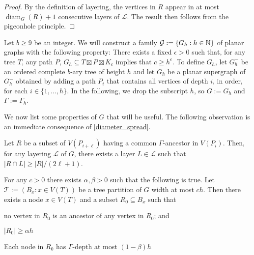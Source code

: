 \documentclass{patmorin}
\newcommand{\defin}[1]{\emph{\color{brightmaroon}#1}}
\DeclareMathOperator{\diam}{diam}
\begin{document}
\begin{proof}
  By the definition of layering, the vertices in $R$ appear in at most $\diam_G(R)+1$ consecutive layers of $\mathcal{L}$. The result then follows from the pigeonhole principle.
\end{proof}


Let $b\ge 9$ be an integer.  We will construct a family $\mathcal{G}:=\{G_h:h\in\mathbb{N}\}$ of planar graphs with the following property:  There exists a fixed $\epsilon >0$ such that, for any tree $T$, any path $P$, $G_h\subseteq T\boxtimes P\boxtimes K_c$ implies that $c\ge h^\epsilon$.  To define $G_h$, let $G_h^-$ be an ordered complete $b$-ary tree of height $h$ and let $G_h$ be a planar supergraph of $G_h^-$ obtained by adding a path $P_i$ that contains all vertices of depth $i$, in order, for each $i\in\{1,\ldots,h\}$.   In the following, we drop the subscript $h$, so $G:=G_h$ and $\Gamma:=\Gamma_h$.

We now list some properties of $G$ that will be useful.  The following observation is an immediate consequence of \cref{diameter_spread}.

\begin{obs}\label{ancestor_spread}
  Let $R$ be a subset of $V(P_{i+\ell})$ having a common $\Gamma$-ancestor in $V(P_i)$.  Then, for any layering $\mathcal{L}$ of $G$, there exists a layer $L\in\mathcal{L}$ such that $|R\cap L|\ge |R|/(2\ell+1)$. 
\end{obs}


\begin{lem}\label{startup}
  For any $c>0$ there exists $\alpha,\beta>0$ such that the following is true.
  Let $\mathcal{T}:=(B_x:x\in V(T))$ be a tree partition of $G$ width at most $ch$.  Then there exists a node $x\in V(T)$ and a subset $R_0\subseteq B_x$ such that
  \begin{inparaenum}[(i)]
    \item no vertex in $R_0$ is an ancestor of any vertex in $R_0$; and
    \item $|R_0|\ge \alpha h$
    \item Each node in $R_0$ has $\Gamma$-depth at most $(1-\beta)h$ 
  \end{inparaenum}
\end{lem}

\end{document}
